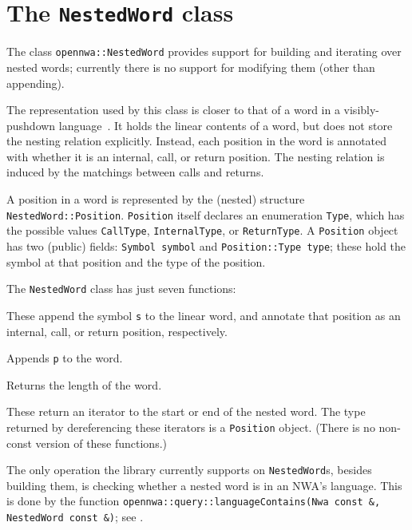\section{The \texttt{NestedWord} class}
\label{Se:class-nested-word}

The class \texttt{opennwa::NestedWord} provides support for
building and iterating over nested words; currently there
is no support for modifying them (other than appending).

The representation used by this class is closer to that of a word in a
visibly-pushdown language~\cite{JACM:AM2009}. It holds the linear contents of
a word, but does not store the nesting relation explicitly. Instead, each
position in the word is annotated with whether it is an internal, call, or
return position. The nesting relation is induced by the matchings between
calls and returns.

A position in a word is represented by the (nested) structure
\texttt{NestedWord::Position}. \texttt{Position} itself declares an
enumeration \texttt{Type}, which has the possible values \texttt{CallType},
\texttt{InternalType}, or \texttt{ReturnType}.
A \texttt{Position} object has two (public) fields: \texttt{Symbol symbol}
and \texttt{Position::Type type}; these hold the symbol at that position and
the type of the position.


The \texttt{NestedWord} class has just seven functions:
\begin{functionlist}
    These append the symbol \texttt{s} to the linear word, and annotate that
    position as an internal, call, or return position, respectively.

    Appends \texttt{p} to the word.

    Returns the length of the word.

    These return an iterator to the start or end
    of the nested word. The type returned by dereferencing these iterators is
    a \texttt{Position} object. (There is no non-const version of these
    functions.)
\end{functionlist}

The only operation the library currently supports on
\texttt{NestedWord}s, besides building them, is checking whether a
nested word is in an NWA's language. This is done by
the function \texttt{opennwa::query::languageContains(\mbox{Nwa const \&}, \mbox{NestedWord const \&})}; see
.

